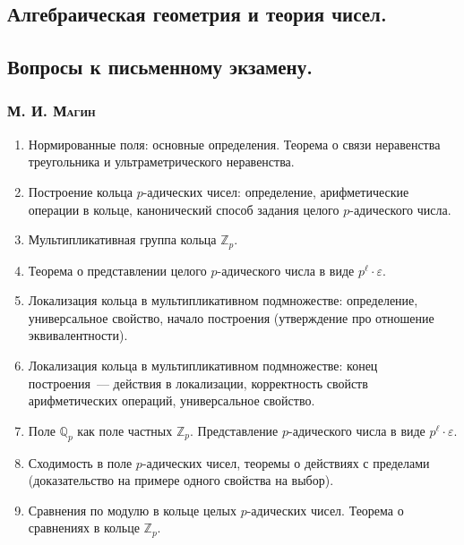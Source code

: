 \documentclass[12pt]{article}
\begin{document}
\begin{center}
    \section*{Алгебраическая геометрия и теория чисел.}
    \subsection*{Вопросы к письменному экзамену. }
    \subsubsection*{\textsc{М. И. Магин}}
\end{center}

\begin{enumerate}
    \item Нормированные поля: основные определения. Теорема о связи неравенства треугольника и ультраметрического неравенства.

    \item Построение кольца $p$-адических чисел: определение, арифметические операции в кольце, канонический способ задания целого $p$-адического числа.

    \item Мультипликативная группа кольца $\mathbb{Z}_p$.

    \item Теорема о представлении целого $p$-адического числа в виде $p^{\ell} \cdot \varepsilon$.

    \item Локализация кольца в мультипликативном подмножестве: определение, универсальное свойство, начало построения (утверждение про отношение эквивалентности).

    \item Локализация кольца в мультипликативном подмножестве: конец построения~--- действия в локализации, корректность свойств арифметических операций, универсальное свойство.

    \item Поле $\mathbb{Q}_p$ как поле частных $\mathbb{Z}_p$. Представление $p$-адического числа в виде $p^{\ell} \cdot \varepsilon$.

    \item Сходимость в поле $p$-адических чисел, теоремы о действиях с пределами (доказательство на примере одного свойства на выбор).

    \item Сравнения по модулю в кольце целых  $p$-адических чисел. Теорема о сравнениях в кольце $\mathbb{Z}_p$.


\end{enumerate}
\end{document}
